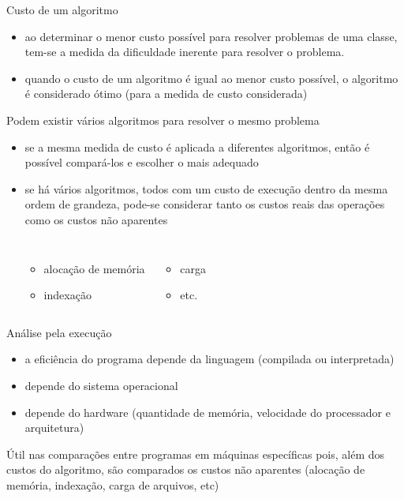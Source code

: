 \begin{frame}[label=graduacao]
	Custo de um algoritmo
	\begin{itemize}
		\item ao determinar o menor custo possível para resolver problemas de uma 
		classe, tem-se a medida da dificuldade inerente para resolver o problema.
		\item quando o custo de um algoritmo é igual ao menor custo possível, o 
		algoritmo é considerado ótimo (para a medida de custo considerada)
	\end{itemize}
	\vfill\pause
	Podem existir vários algoritmos para resolver o mesmo problema
	\begin{itemize}
		\item se a mesma medida de custo é aplicada a diferentes algoritmos, 
		então é possível compará-los e escolher o mais adequado
		\item se há vários algoritmos, todos com um custo de execução dentro da 
		mesma ordem de grandeza, pode-se considerar tanto os custos reais das 
		operações como os custos não aparentes
			\vspace{-1\baselineskip}
			\begin{columns}[T]
					\begin{itemize}
						\setlength{\itemsep}{0pt}
						\item alocação de memória
						\item indexação
					\end{itemize}
					\begin{itemize}
						\setlength{\itemsep}{0pt}
						\item carga
						\item etc.
					\end{itemize}
			\end{columns}
	\end{itemize}
\end{frame}

\begin{frame}[label=graduacao]
	Análise pela execução
		\begin{itemize}
			\item a eficiência do programa depende da linguagem (compilada ou interpretada)
			\item depende do sistema operacional
			\item depende do hardware (quantidade de memória, velocidade do 
			processador e arquitetura)
		\end{itemize}
	\vfill\pause
	\begin{beamerboxesrounded}{}
		Útil nas comparações entre programas em máquinas específicas pois, além 
		dos custos do algoritmo, são comparados os custos não aparentes (alocação 
		de memória, indexação, carga de arquivos, etc)
	\end{beamerboxesrounded}
\end{frame}

